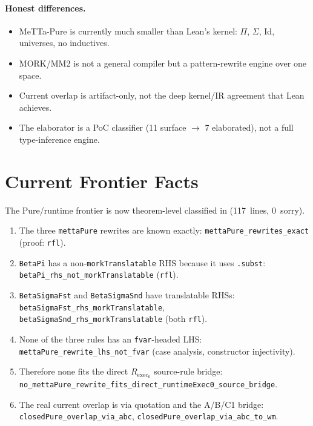 \documentclass[11pt]{article}
\theoremstyle{remark}
\newcommand{\MeTTa}{\textup{MeTTa}}
\newcommand{\MORK}{\textup{MORK}}
\newcommand{\code}[1]{\texttt{#1}}
\newcommand{\codepath}[1]{\path{#1}}
\newcommand{\leanref}[1]{\texttt{#1}}
\begin{document}
\paragraph{Honest differences.}
\begin{itemize}
  \item \MeTTa-Pure is currently much smaller than Lean's kernel:
  $\Pi$, $\Sigma$, Id, universes, no inductives.
  \item \MORK{}/MM2 is not a general compiler but a pattern-rewrite engine
  over one space.
  \item Current overlap is artifact-only, not the deep kernel/IR agreement
  that Lean achieves.
  \item The elaborator is a PoC classifier (11 surface $\to$ 7 elaborated),
  not a full type-inference engine.
\end{itemize}

\section{Current Frontier Facts}
\label{sec:frontier}

The Pure/runtime frontier is now theorem-level classified in
\codepath{PureRuntimeFrontier.lean} (117~lines, 0~sorry).

\begin{enumerate}
  \item The three \code{mettaPure} rewrites are known exactly:
  \leanref{mettaPure\_rewrites\_exact} (proof: \code{rfl}).

  \item \code{BetaPi} has a non-\leanref{morkTranslatable} RHS because it
  uses \code{.subst}:
  \leanref{betaPi\_rhs\_not\_morkTranslatable} (\code{rfl}).

  \item \code{BetaSigmaFst} and \code{BetaSigmaSnd} have translatable RHSs:
  \leanref{betaSigmaFst\_rhs\_morkTranslatable},
  \leanref{betaSigmaSnd\_rhs\_morkTranslatable} (both \code{rfl}).

  \item None of the three rules has an \code{fvar}-headed LHS:
  \leanref{mettaPure\_rewrite\_lhs\_not\_fvar}
  (case analysis, constructor injectivity).

  \item Therefore none fits the direct $R_{\mathrm{exec}_0}$ source-rule
  bridge:
  \leanref{no\_mettaPure\_rewrite\_fits\_direct\_runtimeExec0\_source\_bridge}.

  \item The real current overlap is via quotation and the A/B/C1 bridge:
  \leanref{closedPure\_overlap\_via\_abc},
  \leanref{closedPure\_overlap\_via\_abc\_to\_wm}.
\end{enumerate}
\end{document}
